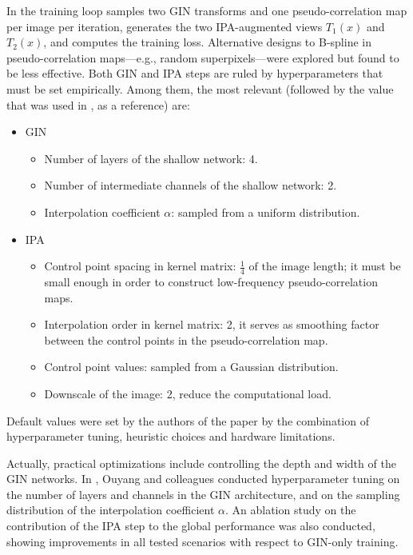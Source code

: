 In \cite{Ouyang2023} the training loop samples two GIN transforms and one pseudo-correlation map per image per iteration, generates the two IPA-augmented views $T_1(x)$ and $T_2(x)$, and computes the training loss. Alternative designs to B-spline in pseudo-correlation maps---e.g., random superpixels---were explored but found to be less effective. Both GIN and IPA steps are ruled by hyperparameters that must be set empirically. Among them, the most relevant (followed by the value that was used in \cite{Ouyang2023}, as a reference) are:
\begin{itemize}
    \item GIN
    \begin{itemize}
        \item Number of layers of the shallow network: \num{4}.
        \item Number of intermediate channels of the shallow network: \num{2}.
        \item Interpolation coefficient $\alpha$: sampled from a uniform distribution.
    \end{itemize}
    \item IPA
    \begin{itemize}
        \item Control point spacing in kernel matrix: $\frac{1}{4}\textrm{ of the image length}$; it must be small enough in order to construct low-frequency pseudo-correlation maps.
        \item Interpolation order in kernel matrix: \num{2}, it serves as smoothing factor between the control points in the pseudo-correlation map.
        \item Control point values: sampled from a Gaussian distribution.
        \item Downscale of the image: \num{2}, reduce the computational load.
    \end{itemize}
\end{itemize}
Default values were set by the authors of the paper by the combination of hyperparameter tuning, heuristic choices and hardware limitations.

Actually, practical optimizations include controlling the depth and width of the GIN networks. In \cite{Ouyang2023}, Ouyang and colleagues conducted hyperparameter tuning on the number of layers and channels in the GIN architecture, and on the sampling distribution of the interpolation coefficient $\alpha$. An ablation study on the contribution of the IPA step to the global performance was also conducted, showing improvements in all tested scenarios with respect to GIN-only training.

